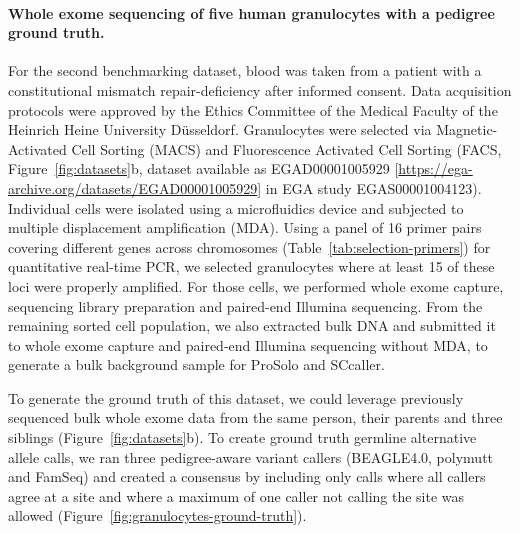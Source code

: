 \documentclass[12pt,inline]{wlscirep}
\begin{document}
\paragraph{Whole exome sequencing of five human granulocytes with a pedigree ground truth.}
\begin{sloppypar}
For the second benchmarking dataset, blood was taken from a patient with a constitutional mismatch repair-deficiency\cite{hoell_constitutional_2014} after informed consent.
Data acquisition protocols were approved by the Ethics Committee of the Medical Faculty of the Heinrich Heine University Düsseldorf.
Granulocytes were selected via Magnetic-Activated Cell Sorting (MACS) and Fluorescence Activated Cell Sorting (FACS, Figure~\ref{fig:datasets}b, dataset available as \mbox{EGAD00001005929} [\url{https://ega-archive.org/datasets/EGAD00001005929}] in EGA study \mbox{EGAS00001004123}).
Individual cells were isolated using a microfluidics device and subjected to multiple displacement amplification (MDA).
Using a panel of 16 primer pairs covering different genes across chromosomes (Table~\ref{tab:selection-primers}) for quantitative real-time PCR, we selected granulocytes where at least 15 of these loci were properly amplified.
For those cells, we performed whole exome capture, sequencing library preparation and paired-end Illumina sequencing.
From the remaining sorted cell population, we also extracted bulk DNA and submitted it to whole exome capture and paired-end Illumina sequencing without MDA, to generate a bulk background sample for ProSolo and SCcaller.
\end{sloppypar}

To generate the ground truth of this dataset, we could leverage previously sequenced bulk whole exome data from the same person, their parents and three siblings \cite{hoell_constitutional_2014} (Figure~\ref{fig:datasets}b).
To create ground truth germline alternative allele calls, we ran three pedigree-aware variant callers (BEAGLE4.0\cite{browning_improving_2013}, polymutt\cite{li_likelihood-based_2012} and FamSeq\cite{peng_rare_2013,peng_famseq:_2014}) and created a consensus by including only calls where all callers agree at a site and where a maximum of one caller not calling the site was allowed (Figure~\ref{fig:granulocytes-ground-truth}).
\end{document}
